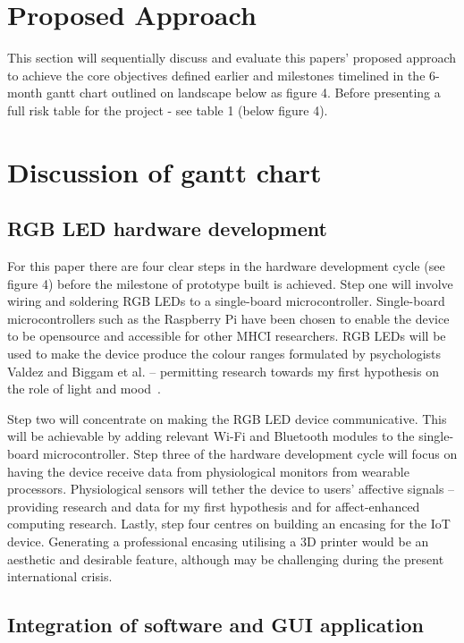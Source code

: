 \documentclass{sigchi}
\begin{document}
\section{Proposed Approach}

This section will sequentially discuss and evaluate this papers’ proposed approach to achieve the core objectives defined earlier and milestones timelined in the 6-month gantt chart outlined on  landscape below as figure 4. Before presenting a full risk table for the project - see table 1 (below figure 4). 

\section{Discussion of gantt chart}
\subsection{RGB LED hardware development}

For this paper there are four clear steps in the hardware development cycle (see figure 4) before the milestone of prototype built is achieved. Step one will involve wiring and soldering RGB LEDs to a single-board microcontroller. Single-board microcontrollers such as the Raspberry Pi have been chosen to enable the device to be opensource and accessible for other MHCI researchers. RGB LEDs will be used to make the device produce the colour ranges formulated by psychologists Valdez and Biggam et al. – permitting research towards my first hypothesis on the role of light and mood~\cite{biggam2006progress, valdez1994effects}.

Step two will concentrate on making the RGB LED device communicative. This will be achievable by adding relevant Wi-Fi and Bluetooth modules to the single-board microcontroller. Step three of the hardware development cycle will focus on having the device receive data from physiological monitors from wearable processors. Physiological sensors will tether the device to users’ affective signals – providing research and data for my first hypothesis and for affect-enhanced computing research. Lastly, step four centres on building an encasing for the IoT device. Generating a professional encasing utilising a 3D printer would be an aesthetic and desirable feature, although may be challenging during the present international crisis.

\subsection{Integration of software and GUI application}
\end{document}
